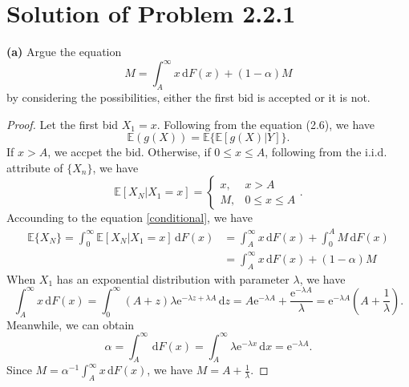 \documentclass[reqno,a4paper,14pt]{amsart}
\newcommand\me{\mathrm{e}}
\newcommand\dif{\,\mathrm{d}}
\newcommand\mE{\mathbb{E}}
\begin{document}
\section{Solution of Problem 2.2.1}
\textbf{(a)} Argue the equation 
\begin{equation*}
    M=\int_A^\infty x \dif F(x) +(1-\alpha) M
\end{equation*}
by considering the possibilities, either the first bid is accepted or it is not.
\begin{proof}
    Let the first bid $X_1=x$. Following from the equation (2.6), we have 
    \begin{equation}
        \mE (g(X))=\mE \{\mE [g(X)|Y]\}.
        \label{conditional}
    \end{equation}
    If $x>A$, we accpet the bid. Otherwise, if $0\leq x\leq A$, following from the i.i.d. attribute of $\{X_n\}$, we have 
    \begin{equation*}
        \mE [X_N|X_1=x]=
        \begin{cases}
            x,& x>A\\
            M,& 0\leq x\leq A
        \end{cases}.
    \end{equation*}
    Accounding to the equation \eqref{conditional}, we have 
    \begin{equation*}
        \begin{split}
            \mE \{X_N\}=\int_0^\infty \mE [X_N|X_1=x] \dif F(x)&= \int_A^\infty x\dif F(x)+\int_0^A M\dif F(x)\\
            &=\int_A^\infty x\dif F(x)+(1-\alpha)M
        \end{split} 
    \end{equation*}
    When $X_1$ has an exponential distribution with parameter $\lambda$, we have 
    \begin{equation*}
        \int_A^\infty x\dif F(x)= \int_0^\infty (A+z) \lambda \me^{-\lambda z+\lambda A}\dif z =A\me^{-\lambda A}+\frac{\me^{-\lambda A}}{\lambda}=\me^{-\lambda A}(A+\frac{1}{\lambda}).
    \end{equation*}
    Meanwhile, we can obtain
    \begin{equation*}
        \alpha=\int_A^\infty \dif F(x)=\int_A^\infty \lambda \me^{-\lambda x}\dif x=\me^{-\lambda A}.
    \end{equation*}
    Since $M=\alpha^{-1} \int_A^\infty x\dif F(x)$, we have $M=A+\frac{1}{\lambda}$.
\end{proof}
\end{document}
